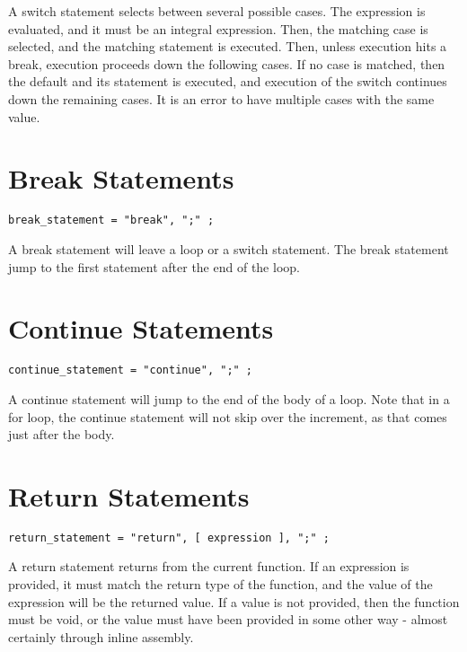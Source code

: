 \documentclass[letterpaper,12pt]{book}
\begin{document}
A switch statement selects between several possible cases. The expression is evaluated, and it must be an integral expression. Then, the matching case is selected, and the matching statement is executed. Then, unless execution hits a break, execution proceeds down the following cases. If no case is matched, then the default and its statement is executed, and execution of the switch continues down the remaining cases. It is an error to have multiple cases with the same value.

\section{Break Statements}

\begin{lstlisting}[breaklines=true]
break_statement = "break", ";" ;
\end{lstlisting}

A break statement will leave a loop or a switch statement. The break statement jump to the first statement after the end of the loop.

\section{Continue Statements}

\begin{lstlisting}[breaklines=true]
continue_statement = "continue", ";" ;
\end{lstlisting}

A continue statement will jump to the end of the body of a loop. Note that in a for loop, the continue statement will not skip over the increment, as that comes just after the body.

\section{Return Statements}

\begin{lstlisting}[breaklines=true]
return_statement = "return", [ expression ], ";" ;
\end{lstlisting}

A return statement returns from the current function. If an expression is provided, it must match the return type of the function, and the value of the expression will be the returned value. If a value is not provided, then the function must be void, or the value must have been provided in some other way - almost certainly through inline assembly.
\end{document}
